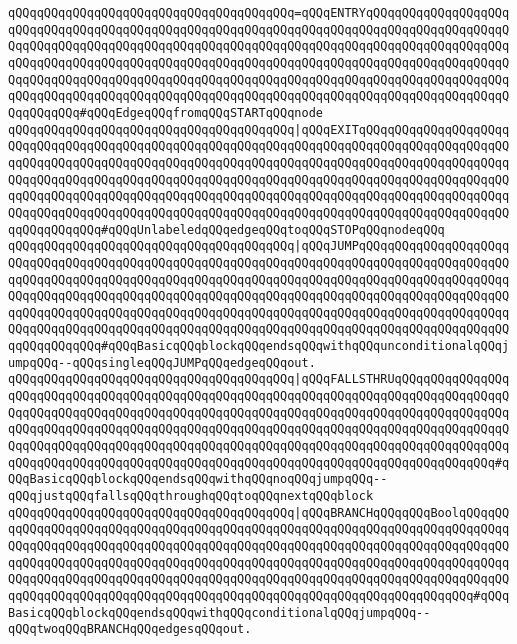 \verb|qQQqqQQqqQQqqQQqqQQqqQQqqQQqqQQqqQQqqQQq=qQQqENTRYqQQqqQQqqQQqqQQqqQQqqQQqqQQqqQQqqQQqqQQqqQQqqQQqqQQqqQQqqQQqqQQqqQQqqQQqqQQqqQQqqQQqqQQqqQQqqQQqqQQqqQQqqQQqqQQqqQQqqQQqqQQqqQQqqQQqqQQqqQQqqQQqqQQqqQQqqQQqqQQqqQQqqQQqqQQqqQQqqQQqqQQqqQQqqQQqqQQqqQQqqQQqqQQqqQQqqQQqqQQqqQQqqQQqqQQqqQQqqQQqqQQqqQQqqQQqqQQqqQQqqQQqqQQqqQQqqQQqqQQqqQQqqQQqqQQqqQQqqQQqqQQqqQQqqQQqqQQqqQQqqQQqqQQqqQQqqQQqqQQqqQQqqQQqqQQqqQQqqQQqqQQqqQQqqQQqqQQqqQQq#qQQqEdgeqQQqfromqQQqSTARTqQQqnode|\newline
\verb|qQQqqQQqqQQqqQQqqQQqqQQqqQQqqQQqqQQqqQQq|\verb#|qQQqEXITqQQqqQQqqQQqqQQqqQQqqQQqqQQqqQQqqQQqqQQqqQQqqQQqqQQqqQQqqQQqqQQqqQQqqQQqqQQqqQQqqQQqqQQqqQQqqQQqqQQqqQQqqQQqqQQqqQQqqQQqqQQqqQQqqQQqqQQqqQQqqQQqqQQqqQQqqQQqqQQqqQQqqQQqqQQqqQQqqQQqqQQqqQQqqQQqqQQqqQQqqQQqqQQqqQQqqQQqqQQqqQQqqQQqqQQqqQQqqQQqqQQqqQQqqQQqqQQqqQQqqQQqqQQqqQQqqQQqqQQqqQQqqQQqqQQqqQQqqQQqqQQqqQQqqQQqqQQqqQQqqQQqqQQqqQQqqQQqqQQqqQQqqQQqqQQqqQQqqQQqqQQqqQQqqQQqqQQqqQQqqQQq#\verb|#qQQqUnlabeledqQQqedgeqQQqtoqQQqSTOPqQQqnodeqQQq|\newline
\verb|qQQqqQQqqQQqqQQqqQQqqQQqqQQqqQQqqQQqqQQq|\verb#|qQQqJUMPqQQqqQQqqQQqqQQqqQQqqQQqqQQqqQQqqQQqqQQqqQQqqQQqqQQqqQQqqQQqqQQqqQQqqQQqqQQqqQQqqQQqqQQqqQQqqQQqqQQqqQQqqQQqqQQqqQQqqQQqqQQqqQQqqQQqqQQqqQQqqQQqqQQqqQQqqQQqqQQqqQQqqQQqqQQqqQQqqQQqqQQqqQQqqQQqqQQqqQQqqQQqqQQqqQQqqQQqqQQqqQQqqQQqqQQqqQQqqQQqqQQqqQQqqQQqqQQqqQQqqQQqqQQqqQQqqQQqqQQqqQQqqQQqqQQqqQQqqQQqqQQqqQQqqQQqqQQqqQQqqQQqqQQqqQQqqQQqqQQqqQQqqQQqqQQqqQQqqQQqqQQqqQQqqQQqqQQqqQQqqQQq#\verb|#qQQqBasicqQQqblockqQQqendsqQQqwithqQQqunconditionalqQQqjumpqQQq--qQQqsingleqQQqJUMPqQQqedgeqQQqout.|\newline
\verb|qQQqqQQqqQQqqQQqqQQqqQQqqQQqqQQqqQQqqQQq|\verb#|qQQqFALLSTHRUqQQqqQQqqQQqqQQqqQQqqQQqqQQqqQQqqQQqqQQqqQQqqQQqqQQqqQQqqQQqqQQqqQQqqQQqqQQqqQQqqQQqqQQqqQQqqQQqqQQqqQQqqQQqqQQqqQQqqQQqqQQqqQQqqQQqqQQqqQQqqQQqqQQqqQQqqQQqqQQqqQQqqQQqqQQqqQQqqQQqqQQqqQQqqQQqqQQqqQQqqQQqqQQqqQQqqQQqqQQqqQQqqQQqqQQqqQQqqQQqqQQqqQQqqQQqqQQqqQQqqQQqqQQqqQQqqQQqqQQqqQQqqQQqqQQqqQQqqQQqqQQqqQQqqQQqqQQqqQQqqQQqqQQqqQQqqQQqqQQqqQQqqQQqqQQqqQQqqQQqqQQq#\verb|#qQQqBasicqQQqblockqQQqendsqQQqwithqQQqnoqQQqjumpqQQq--qQQqjustqQQqfallsqQQqthroughqQQqtoqQQqnextqQQqblock|\newline
\verb|qQQqqQQqqQQqqQQqqQQqqQQqqQQqqQQqqQQqqQQq|\verb#|qQQqBRANCHqQQqqQQqBoolqQQqqQQqqQQqqQQqqQQqqQQqqQQqqQQqqQQqqQQqqQQqqQQqqQQqqQQqqQQqqQQqqQQqqQQqqQQqqQQqqQQqqQQqqQQqqQQqqQQqqQQqqQQqqQQqqQQqqQQqqQQqqQQqqQQqqQQqqQQqqQQqqQQqqQQqqQQqqQQqqQQqqQQqqQQqqQQqqQQqqQQqqQQqqQQqqQQqqQQqqQQqqQQqqQQqqQQqqQQqqQQqqQQqqQQqqQQqqQQqqQQqqQQqqQQqqQQqqQQqqQQqqQQqqQQqqQQqqQQqqQQqqQQqqQQqqQQqqQQqqQQqqQQqqQQqqQQqqQQqqQQqqQQqqQQqqQQqqQQqqQQqqQQqqQQq#\verb|#qQQqBasicqQQqblockqQQqendsqQQqwithqQQqconditionalqQQqjumpqQQq--qQQqtwoqQQqBRANCHqQQqedgesqQQqout.|\newline
